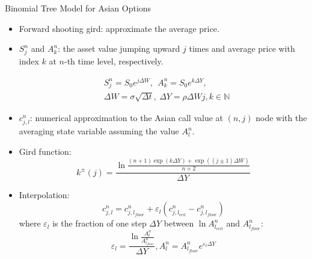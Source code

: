 \documentclass[8pt]{beamer}
\numberwithin{equation}{section}
\begin{document}
\begin{frame}{Binomial Tree Model for Asian Options}
\begin{itemize}
\item Forward shooting gird: approximate the average price.
\item $ S^n_j $ and $ A^n_k $: the asset value jumping upward $ j $ times and average price with index $ k $ at $ n $-th time level, respectively.

\begin{equation}
\begin{split}
&S^n_j= S_0 e^{j \Delta W}, \ \ A^n_k = S_0 e^{k \Delta Y}, \\ &\Delta W = \sigma\sqrt{\Delta t},\ \Delta Y = \rho\Delta W j, k \in\mathbb{N}
\end{split}
\end{equation}
\item $ c^n_{j, l} $: numerical approximation to the Asian call value at $ (n, j) $ node with the averaging state variable assuming the value $ A^n_l $.

\item Gird function:
\begin{equation}\label{arith: grid func}
k^{\pm}(j) = \frac{\ln\frac{(n + 1) \exp(k \Delta Y) + \exp((j \pm 1) \Delta W)}{n + 2}}{\Delta Y}
\end{equation}
\item Interpolation:
\begin{equation}\label{arith: interpolation}
c^n_{j, l} = c^n_{j, l_{floor}} + \varepsilon_l (c^n_{j, l_{ceil}} - c^n_{j, l_{floor}})
\end{equation}
where $ \varepsilon_l $ is the fraction of one step $ \Delta Y $ between $ \ln A^n_{l_{ceil}} $ and $ A^n_{l_{floor}} $:
\begin{equation}
\varepsilon_l = \frac{\ln\frac{A^n_l}{A^n_{l_{floor}}}}{\Delta Y}, A^n_l =  A^n_{l_{floor}} e^{\varepsilon_l \Delta Y}
\end{equation}
\end{itemize}
\end{frame}
\end{document}

